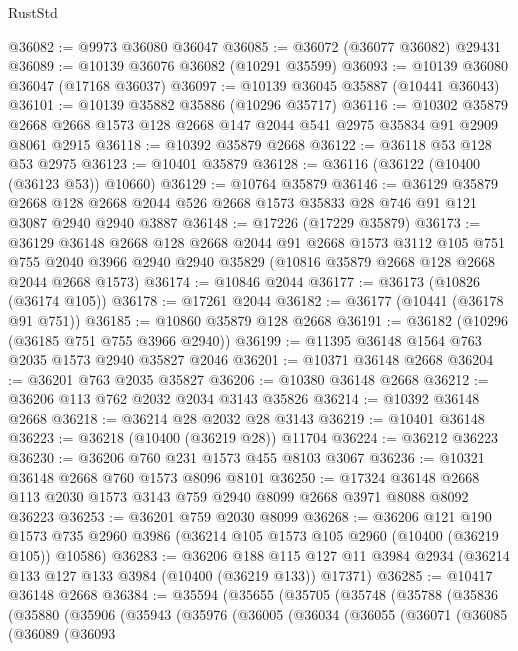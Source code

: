 \begin{lexlean}{RustStd}
\begin{coremodule}
@36082 := @9973 @36080 @36047
@36085 := @36072 (@36077 @36082) @29431
@36089 := @10139 @36076 @36082 (@10291 @35599)
@36093 := @10139 @36080 @36047 (@17168 @36037)
@36097 := @10139 @36045 @35887 (@10441 @36043)
@36101 := @10139 @35882 @35886 (@10296 @35717)
@36116 := @10302
    @35879
    @2668
    @2668
    @1573
    @128
    @2668
    @147
    @2044
    @541
    @2975
    @35834
    @91
    @2909
    @8061
    @2915
@36118 := @10392 @35879 @2668
@36122 := @36118 @53 @128 @53 @2975
@36123 := @10401 @35879
@36128 := @36116 (@36122 (@10400 (@36123 @53)) @10660)
@36129 := @10764 @35879
@36146 := @36129
    @35879
    @2668
    @128
    @2668
    @2044
    @526
    @2668
    @1573
    @35833
    @28
    @746
    @91
    @121
    @3087
    @2940
    @2940
    @3887
@36148 := @17226 (@17229 @35879)
@36173 := @36129
    @36148
    @2668
    @128
    @2668
    @2044
    @91
    @2668
    @1573
    @3112
    @105
    @751
    @755
    @2040
    @3966
    @2940
    @2940
    @35829
    (@10816 @35879 @2668 @128 @2668 @2044 @2668 @1573)
@36174 := @10846 @2044
@36177 := @36173 (@10826 (@36174 @105))
@36178 := @17261 @2044
@36182 := @36177 (@10441 (@36178 @91 @751))
@36185 := @10860 @35879 @128 @2668
@36191 := @36182 (@10296 (@36185 @751 @755 @3966 @2940))
@36199 := @11395 @36148 @1564 @763 @2035 @1573 @2940 @35827 @2046
@36201 := @10371 @36148 @2668
@36204 := @36201 @763 @2035 @35827
@36206 := @10380 @36148 @2668
@36212 := @36206 @113 @762 @2032 @2034 @3143 @35826
@36214 := @10392 @36148 @2668
@36218 := @36214 @28 @2032 @28 @3143
@36219 := @10401 @36148
@36223 := @36218 (@10400 (@36219 @28)) @11704
@36224 := @36212 @36223
@36230 := @36206 @760 @231 @1573 @455 @8103 @3067
@36236 := @10321 @36148 @2668 @760 @1573 @8096 @8101
@36250 := @17324 @36148 @2668 @113 @2030 @1573 @3143 @759 @2940 @8099 @2668 @3971 @8088 @8092 @36223
@36253 := @36201 @759 @2030 @8099
@36268 := @36206
    @121
    @190
    @1573
    @735
    @2960
    @3986
    (@36214 @105 @1573 @105 @2960 (@10400 (@36219 @105)) @10586)
@36283 := @36206
    @188
    @115
    @127
    @11
    @3984
    @2934
    (@36214 @133 @127 @133 @3984 (@10400 (@36219 @133)) @17371)
@36285 := @10417 @36148 @2668
@36384 := @35594
    (@35655
      (@35705
        (@35748
          (@35788
            (@35836
              (@35880
                (@35906
                  (@35943
                    (@35976
                      (@36005
                        (@36034
                          (@36055
                            (@36071
                              (@36085
                                (@36089
                                  (@36093

\end{coremodule}
\end{lexlean}
